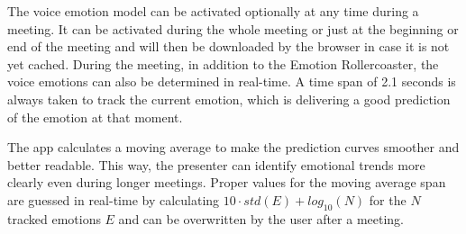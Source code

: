 The voice emotion model can be activated optionally at any time during a meeting. It can be activated during the whole meeting or just at the beginning or end of the meeting and will then be downloaded by the browser in case it is not yet cached. During the meeting, in addition to the Emotion Rollercoaster, the voice emotions can also be determined in real-time. A time span of 2.1 seconds is always taken to track the current emotion, which is delivering a good prediction of the emotion at that moment.

The app calculates a moving average to make the prediction curves smoother and better readable. This way, the presenter can identify emotional trends more clearly even during longer meetings. Proper values for the moving average span are guessed in real-time by calculating $10 \cdot std(E) + log_{10}(N)$ for the $N$ tracked emotions $E$ and can be overwritten by the user after a meeting.
